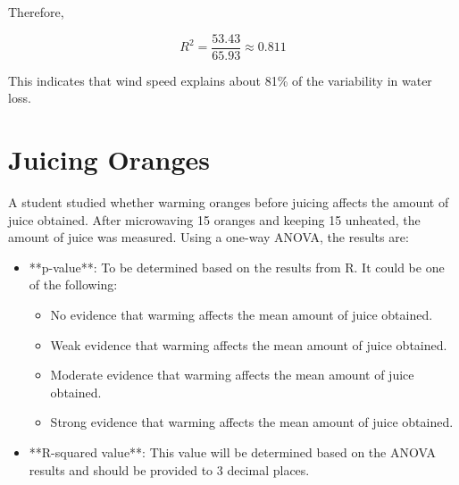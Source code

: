 \documentclass{article}
\begin{document}
   Therefore,

   \[
   R^2 = \frac{53.43}{65.93} \approx 0.811
   \]

   This indicates that wind speed explains about 81\% of the variability in water loss.

\section*{Juicing Oranges}

A student studied whether warming oranges before juicing affects the amount of juice obtained. After microwaving 15 oranges and keeping 15 unheated, the amount of juice was measured. Using a one-way ANOVA, the results are:

\begin{itemize}
    \item **p-value**: To be determined based on the results from R. It could be one of the following:
    \begin{itemize}
        \item No evidence that warming affects the mean amount of juice obtained.
        \item Weak evidence that warming affects the mean amount of juice obtained.
        \item Moderate evidence that warming affects the mean amount of juice obtained.
        \item Strong evidence that warming affects the mean amount of juice obtained.
    \end{itemize}
    \item **R-squared value**: This value will be determined based on the ANOVA results and should be provided to 3 decimal places.
\end{itemize}
\end{document}
